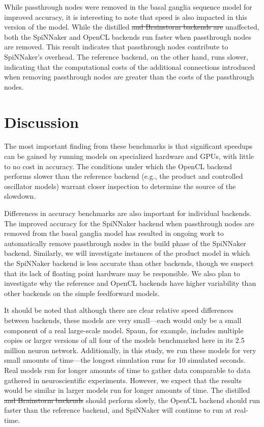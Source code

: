 \documentclass{frontiersSCNS}
\providecommand{\DIFadd}[1]{{\protect\color{blue}\uwave{#1}}} %
\providecommand{\DIFdel}[1]{{\protect\color{red}\sout{#1}}}                      %
\providecommand{\DIFaddbegin}{} %
\providecommand{\DIFaddend}{} %
\providecommand{\DIFdelbegin}{} %
\providecommand{\DIFdelend}{} %
\begin{document}
While passthrough nodes were removed
in the basal ganglia sequence model
for improved accuracy,
it is interesting to note that speed
is also impacted in this version of the model.
While the distilled \DIFdelbegin \DIFdel{and Brainstorm backends
are }\DIFdelend \DIFaddbegin \DIFadd{backend
is }\DIFaddend unaffected,
both the SpiNNaker and OpenCL backends run faster
when passthrough nodes are removed.
This result indicates that passthrough nodes
contribute to SpiNNaker's overhead.
The reference backend, on the other hand,
runs slower,
indicating that the computational costs
of the additional connections introduced
when removing passthrough nodes
are greater than the costs of
the passthrough nodes.

\section{Discussion}

The most important finding from these benchmarks
is that significant speedups can be gained by
running models on specialized hardware and GPUs,
with little to no cost in accuracy.
The conditions under which the OpenCL backend
performs slower than the reference backend
(e.g., the product and controlled oscillator models)
warrant closer inspection to determine the source
of the slowdown.

Differences in accuracy benchmarks
are also important for individual backends.
The improved accuracy
for the SpiNNaker backend
when passthrough nodes are removed
from the basal ganglia model
has resulted in ongoing work to
automatically remove passthrough nodes
in the build phase of the SpiNNaker backend.
Similarly, we will investigate
instances of the product model
in which the SpiNNaker backend
is less accurate than other backends,
though we suspect that its
lack of floating point hardware
may be responsible.
We also plan to investigate
why the reference and OpenCL backends
have higher variability than other backends on
the simple feedforward models.

It should be noted that although there are clear
relative speed differences between backends,
these models are very small---each would only
be a small component of a real large-scale model.
Spaun, for example, includes multiple copies
or larger versions of all four of the models
benchmarked here in its 2.5 million neuron network.
Additionally, in this study, we run these models
for very small amounts of time---the longest
simulation runs for 10 simulated seconds.
Real models run for longer amounts of time
to gather data comparable to data gathered
in neuroscientific experiments.
However, we expect that the results
would be similar
in larger models run for longer amounts of time.
The distilled \DIFdelbegin \DIFdel{and Brainstorm backends }\DIFdelend \DIFaddbegin \DIFadd{backend }\DIFaddend should
perform slowly, the OpenCL backend should
run faster than the reference backend,
and SpiNNaker will continue to run at real-time.
\end{document}
